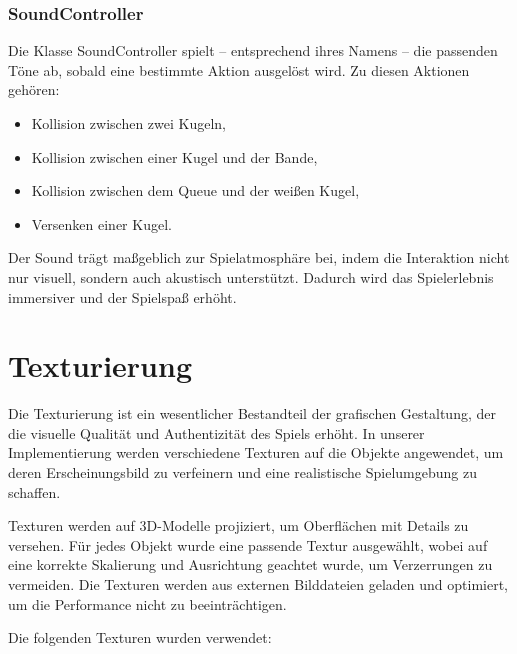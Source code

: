 \documentclass[a4paper,12pt]{article}
\begin{document}
\subsubsection{SoundController}  

Die Klasse SoundController spielt – entsprechend ihres Namens – die passenden Töne ab, sobald eine bestimmte Aktion ausgelöst wird.  
Zu diesen Aktionen gehören:  

\begin{itemize}
	\item Kollision zwischen zwei Kugeln,
	\item Kollision zwischen einer Kugel und der Bande,
	\item Kollision zwischen dem Queue und der weißen Kugel,
	\item Versenken einer Kugel.
\end{itemize}

Der Sound trägt maßgeblich zur Spielatmosphäre bei, indem die Interaktion nicht nur visuell, sondern auch akustisch unterstützt. Dadurch wird das Spielerlebnis immersiver und der Spielspaß erhöht.  


	


	
	\newpage
\section{Texturierung}

Die Texturierung ist ein wesentlicher Bestandteil der grafischen Gestaltung, der die visuelle Qualität und Authentizität des Spiels erhöht. In unserer Implementierung werden verschiedene Texturen auf die Objekte angewendet, um deren Erscheinungsbild zu verfeinern und eine realistische Spielumgebung zu schaffen.

Texturen werden auf 3D-Modelle projiziert, um Oberflächen mit Details zu versehen. Für jedes Objekt wurde eine passende Textur ausgewählt, wobei auf eine korrekte Skalierung und Ausrichtung geachtet wurde, um Verzerrungen zu vermeiden. Die Texturen werden aus externen Bilddateien geladen und optimiert, um die Performance nicht zu beeinträchtigen.

Die folgenden Texturen wurden verwendet:
\end{document}
